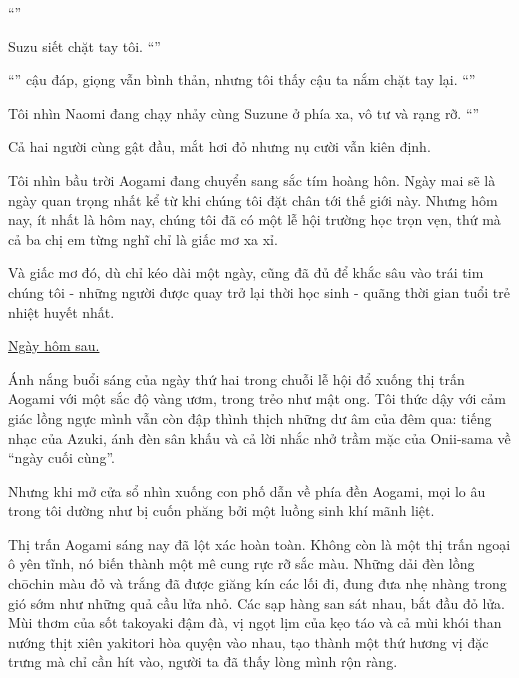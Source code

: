 \documentclass[../main.tex]{subfiles}
\begin{document}
``''

Suzu siết chặt tay tôi. ``''

``'' cậu đáp, giọng vẫn bình thản, nhưng tôi thấy cậu ta nắm chặt tay lại. ``''

Tôi nhìn Naomi đang chạy nhảy cùng Suzune ở phía xa, vô tư và rạng rỡ. ``''

Cả hai người cùng gật đầu, mắt hơi đỏ nhưng nụ cười vẫn kiên định.

Tôi nhìn bầu trời Aogami đang chuyển sang sắc tím hoàng hôn. Ngày mai sẽ là ngày quan trọng nhất kể từ khi chúng tôi đặt chân tới thế giới này. Nhưng hôm nay, ít nhất là hôm nay, chúng tôi đã có một lễ hội trường học trọn vẹn, thứ mà cả ba chị em từng nghĩ chỉ là giấc mơ xa xỉ.

Và giấc mơ đó, dù chỉ kéo dài một ngày, cũng đã đủ để khắc sâu vào trái tim chúng tôi - những người được quay trở lại thời học sinh - quãng thời gian tuổi trẻ nhiệt huyết nhất.

\begin{center}
  \uline{Ngày hôm sau.}
\end{center}

Ánh nắng buổi sáng của ngày thứ hai trong chuỗi lễ hội đổ xuống thị trấn Aogami với một sắc độ vàng ươm, trong trẻo như mật ong. Tôi thức dậy với cảm giác lồng ngực mình vẫn còn đập thình thịch những dư âm của đêm qua: tiếng nhạc của Azuki, ánh đèn sân khấu và cả lời nhắc nhở trầm mặc của Onii-sama về ``ngày cuối cùng''.

Nhưng khi mở cửa sổ nhìn xuống con phố dẫn về phía đền Aogami, mọi lo âu trong tôi dường như bị cuốn phăng bởi một luồng sinh khí mãnh liệt.

Thị trấn Aogami sáng nay đã lột xác hoàn toàn. Không còn là một thị trấn ngoại ô yên tĩnh, nó biến thành một mê cung rực rỡ sắc màu. Những dải đèn lồng chōchin màu đỏ và trắng đã được giăng kín các lối đi, đung đưa nhẹ nhàng trong gió sớm như những quả cầu lửa nhỏ. Các sạp hàng san sát nhau, bắt đầu đỏ lửa. Mùi thơm của sốt takoyaki đậm đà, vị ngọt lịm của kẹo táo và cả mùi khói than nướng thịt xiên yakitori hòa quyện vào nhau, tạo thành một thứ hương vị đặc trưng mà chỉ cần hít vào, người ta đã thấy lòng mình rộn ràng.
\end{document}

